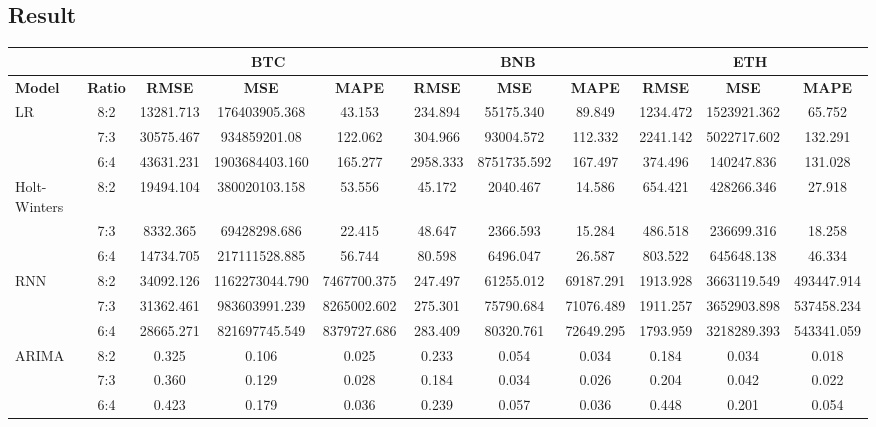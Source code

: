 \documentclass[conference]{IEEEtran}
\begin{document}
\subsection{Result} 
\begin{minipage}{1\textwidth}
\begin{table}[H]
\centering
\small
\setlength{\tabcolsep}{0.5pt} 
\begin{tabular}{|l|c||c||c||c||c||c||c||c||c||c|}
\hline
& & \multicolumn{3}{c|}{\textbf{BTC}} & \multicolumn{3}{c|}{\textbf{BNB}} & \multicolumn{3}{c|}{\textbf{ETH}} \\
\hline
\textbf{Model} & \textbf{Ratio} & \textbf{RMSE} & \textbf{MSE} & \textbf{MAPE} & \textbf{RMSE} & \textbf{MSE} & \textbf{MAPE} & \textbf{RMSE} & \textbf{MSE} & \textbf{MAPE} \\
\hline
LR   & 8:2 & 13281.713 & 176403905.368 & 43.153 & 234.894 & 55175.340 & 89.849 & 1234.472 &  1523921.362 & 65.752\\
    & 7:3 & 30575.467 & 934859201.08 & 122.062 & 304.966 & 93004.572 & 112.332 & 2241.142  & 5022717.602 & 132.291 \\
    & 6:4 & 43631.231 & 1903684403.160 & 165.277 & 2958.333 & 8751735.592 & 167.497 & 374.496 & 140247.836 & 131.028  \\
\hline
Holt-Winters & 8:2 & 19494.104 & 380020103.158 & 53.556 & 45.172 & 2040.467 & 14.586 & 654.421 & 428266.346 & 27.918 \\
    & 7:3 & 8332.365 & 69428298.686 & 22.415 & 48.647 & 2366.593 & 15.284 & 486.518 & 236699.316 & 18.258  \\
    & 6:4 & 14734.705 & 217111528.885 & 56.744 & 80.598 & 6496.047 & 26.587 & 803.522 & 645648.138 & 46.334 \\
\hline
RNN & 8:2 & 34092.126 & 1162273044.790 & 7467700.375 & 247.497 & 61255.012 & 69187.291 & 1913.928 & 3663119.549 & 493447.914 \\
    & 7:3 & 31362.461 & 983603991.239 & 8265002.602 & 275.301 & 75790.684 & 71076.489 & 1911.257 & 3652903.898 & 537458.234 \\
    & 6:4 & 28665.271 & 821697745.549 & 8379727.686 & 283.409 & 80320.761 & 72649.295 & 1793.959 & 3218289.393 & 543341.059 \\
\hline
ARIMA & 8:2 & 0.325 & 0.106 & 0.025 & 0.233 & 0.054 & 0.034 & 0.184 & 0.034 & 0.018 \\
    & 7:3 & 0.360 & 0.129 & 0.028 & 0.184 & 0.034 & 0.026 & 0.204 & 0.042 & 0.022 \\
    & 6:4 & 0.423 & 0.179 & 0.036 & 0.239 & 0.057 & 0.036 & 0.448 & 0.201 & 0.054 \\

\end{tabular}
\end{table}
\end{minipage}
\end{document}
